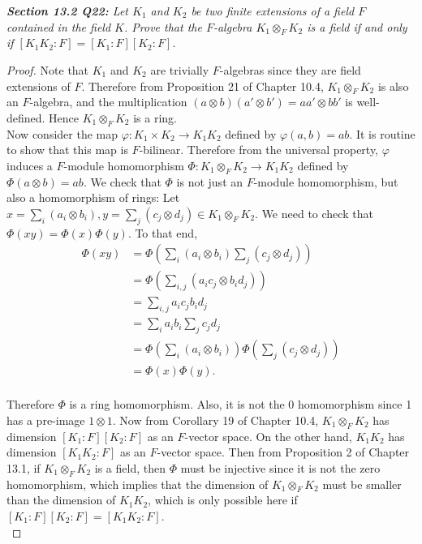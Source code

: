 \documentclass{article}
\begin{document}
\it \textbf{Section 13.2 Q22:} Let $K_1$ and $K_2$ be two finite extensions
  of a field $F$ contained in the field $K$. Prove that the $F$-algebra
  $K_1\otimes_F K_2$ is a field if and only if $[K_1K_2:F]=[K_1:F][K_2:F]$.

  \begin{proof}
    Note that $K_1$ and $K_2$ are trivially $F$-algebras since they are
    field extensions of $F$. Therefore from Proposition 21 of Chapter 10.4,
    $K_1\otimes_F K_2$ is also an $F$-algebra, and the multiplication
    $(a\otimes b)(a'\otimes b')=aa'\otimes bb'$ is well-defined. Hence
    $K_1\otimes_F K_2$ is a ring. \\

    Now consider the map $\varphi:K_1\times K_2\rightarrow K_1K_2$ defined
    by $\varphi(a,b)=ab$. It is routine to show that this map is
    $F$-bilinear. Therefore from the universal property, $\varphi$ induces
    a $F$-module homomorphism $\Phi:K_1\otimes_F K_2\rightarrow K_1K_2$
    defined by $\Phi(a\otimes b)=ab$. We check that $\Phi$ is not just an
    $F$-module homomorphism, but also a homomorphism of rings: Let $x=\sum_i
    (a_i\otimes b_i), y=\sum_j (c_j\otimes d_j) \in K_1\otimes_F K_2$. We
    need to check that $\Phi(xy)=\Phi(x)\Phi(y)$. To that end,
    \begin{align*}
      \Phi(xy) &=\Phi \left(\sum_i (a_i\otimes b_i) \sum_j (c_j\otimes d_j)
        \right)\\
      &=\Phi \left(\sum_{i,j} (a_ic_j\otimes b_id_j) \right)\\
      &=\sum_{i,j} a_ic_jb_id_j\\
      &=\sum_{i} a_ib_i \sum_{j} c_jd_j\\
      &=\Phi \left(\sum_{i} (a_i\otimes b_i) \right) \Phi \left(\sum_{j}
        (c_j\otimes d_j) \right)\\
      &=\Phi(x)\Phi(y).\\
    \end{align*}

    Therefore $\Phi$ is a ring homomorphism. Also, it is not the 0
    homomorphism since 1 has a pre-image $1\otimes 1$. Now from Corollary
    19 of Chapter 10.4, $K_1\otimes_F K_2$ has dimension $[K_1:F][K_2:F]$
    as an $F$-vector space. On the other hand, $K_1K_2$ has dimension
    $[K_1K_2:F]$ as an $F$-vector space. Then from Proposition 2 of Chapter
    13.1, if $K_1\otimes_F K_2$ is a field, then $\Phi$ must be injective
    since it is not the zero homomorphism, which implies that the dimension
    of $K_1\otimes_F K_2$ must be smaller than the dimension of $K_1K_2$,
    which is only possible here if $[K_1:F][K_2:F]=[K_1K_2:F]$. \\


\end{proof}
\end{document}
